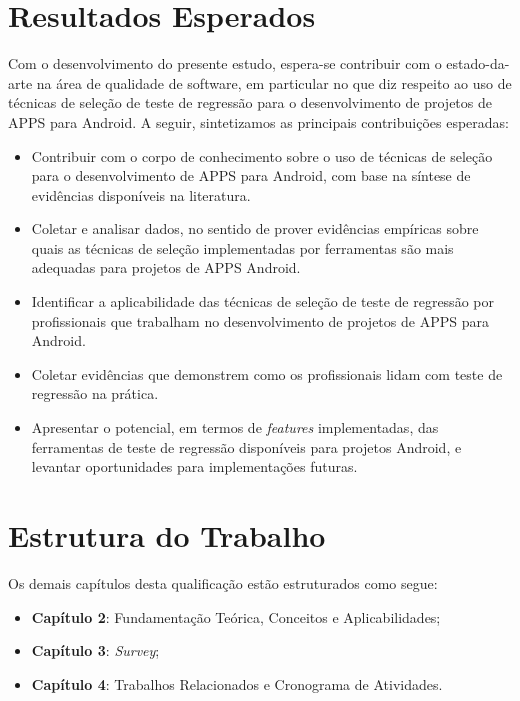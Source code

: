 \section{Resultados Esperados}\label{sec:resultadosesperados}

Com o desenvolvimento do presente estudo, espera-se contribuir com o estado-da-arte na área de qualidade de software, em particular no que diz respeito ao uso de técnicas de seleção de teste de regressão para o desenvolvimento de projetos de \ac{APPS} para Android. A seguir, sintetizamos as principais contribuições esperadas: 

\begin{itemize}

    \item Contribuir com o corpo de conhecimento sobre o uso de técnicas de seleção para o desenvolvimento de \ac{APPS} para Android, com base na síntese de evidências disponíveis na literatura.
    
    \item Coletar e analisar dados, no sentido de prover evidências empíricas sobre quais as técnicas de seleção implementadas por ferramentas são mais adequadas para projetos de \ac{APPS} Android.
    
    \item Identificar a aplicabilidade das técnicas de seleção de teste de regressão por profissionais que trabalham no desenvolvimento de projetos de \ac{APPS} para Android.
    
    \item Coletar evidências que demonstrem como os profissionais lidam com teste de regressão na prática.
    
    \item Apresentar o potencial, em termos de \textit{features} implementadas, das ferramentas de teste de regressão disponíveis para projetos Android, e levantar oportunidades para implementações futuras.

\end{itemize}

\section{Estrutura do Trabalho}\label{sec:estruturadotrabalho}
Os demais capítulos desta qualificação estão estruturados como segue: 
\begin{itemize}
\item \textbf{Capítulo 2}: Fundamentação Teórica, Conceitos e Aplicabilidades;
\item \textbf{Capítulo 3}: \textit{Survey};
\item \textbf{Capítulo 4}: Trabalhos Relacionados e Cronograma de Atividades.
\end{itemize}